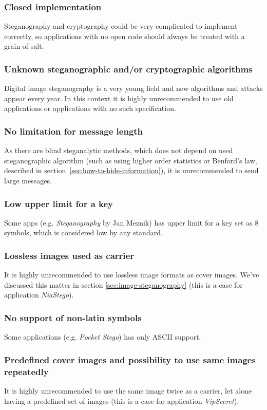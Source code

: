 \subsubsection{Closed implementation}
Steganography and cryptography could be very complicated to implement correctly, so applications with
no open code should always be treated with a grain of salt.

\subsubsection{Unknown steganographic and/or cryptographic algorithms}
Digital image steganography is a very young field and new algorithms and attacks appear every year.
In this context it is highly unrecommended to use old applications or applications with no such 
specification.

\subsubsection{No limitation for message length}
As there are blind steganalytic methods, which does not depend on used steganographic algorithm 
(such as using higher order statistics or Benford's law, described in section~\ref{sec:how-to-hide-information}),
it is unrecommended to send large messages.

\subsubsection{Low upper limit for a key}
Some apps (e.g. \emph{Steganography} by Jan Meznik) has upper limit for a key set as $8$ symbols, which is considered low
by any standard.

\subsubsection{Lossless images used as carrier}
It is highly unrecommended to use lossless image formats as cover images. We've discussed this matter in section \ref{sec:image-steganography}
(this is a case for application \emph{NiaStego}).

\subsubsection{No support of non-latin symbols}
Some applications (e.g. \emph{Pocket Stego}) has only ASCII support.

\subsubsection{Predefined cover images and possibility to use same images repeatedly}
It is highly unrecommended to use the same image twice as a carrier, let alone having 
a predefined set of images (this is a case for application \emph{VipSecret}).

